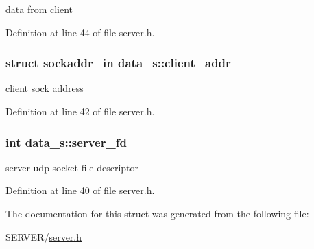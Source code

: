 data from client 



Definition at line 44 of file server.\-h.

\hypertarget{structdata__s_a51ad65b735ac28716f75a66677dec9bb}{
\subsubsection[{client\-\_\-addr}]{\setlength{\rightskip}{0pt plus 5cm}struct sockaddr\-\_\-in data\-\_\-s\-::client\-\_\-addr}}\label{structdata__s_a51ad65b735ac28716f75a66677dec9bb}


client sock address 



Definition at line 42 of file server.\-h.

\hypertarget{structdata__s_a78aaeb875fb9670cbeb1269fee39dd40}{
\subsubsection[{server\-\_\-fd}]{\setlength{\rightskip}{0pt plus 5cm}int data\-\_\-s\-::server\-\_\-fd}}\label{structdata__s_a78aaeb875fb9670cbeb1269fee39dd40}


server udp socket file descriptor 



Definition at line 40 of file server.\-h.



The documentation for this struct was generated from the following file\-:\begin{DoxyCompactItemize}
\item 
S\-E\-R\-V\-E\-R/\hyperlink{server_8h}{server.\-h}\end{DoxyCompactItemize}
